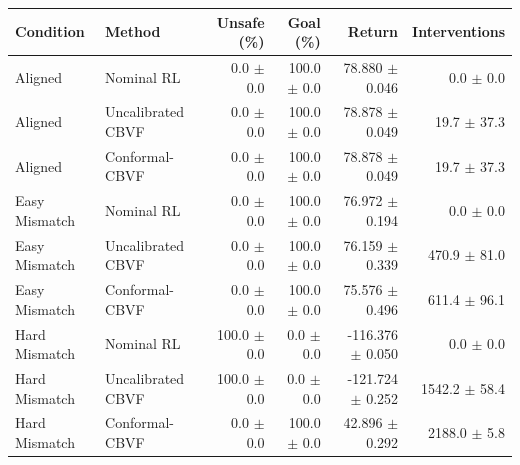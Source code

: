 \begin{tabular}{llrrrr}
\toprule
Condition & Method & Unsafe (\%) & Goal (\%) & Return & Interventions \\
\midrule
Aligned & Nominal RL & 0.0 $\pm$ 0.0 & 100.0 $\pm$ 0.0 & 78.880 $\pm$ 0.046 & 0.0 $\pm$ 0.0 \\
Aligned & Uncalibrated CBVF & 0.0 $\pm$ 0.0 & 100.0 $\pm$ 0.0 & 78.878 $\pm$ 0.049 & 19.7 $\pm$ 37.3 \\
Aligned & Conformal-CBVF & 0.0 $\pm$ 0.0 & 100.0 $\pm$ 0.0 & 78.878 $\pm$ 0.049 & 19.7 $\pm$ 37.3 \\
Easy Mismatch & Nominal RL & 0.0 $\pm$ 0.0 & 100.0 $\pm$ 0.0 & 76.972 $\pm$ 0.194 & 0.0 $\pm$ 0.0 \\
Easy Mismatch & Uncalibrated CBVF & 0.0 $\pm$ 0.0 & 100.0 $\pm$ 0.0 & 76.159 $\pm$ 0.339 & 470.9 $\pm$ 81.0 \\
Easy Mismatch & Conformal-CBVF & 0.0 $\pm$ 0.0 & 100.0 $\pm$ 0.0 & 75.576 $\pm$ 0.496 & 611.4 $\pm$ 96.1 \\
Hard Mismatch & Nominal RL & 100.0 $\pm$ 0.0 & 0.0 $\pm$ 0.0 & -116.376 $\pm$ 0.050 & 0.0 $\pm$ 0.0 \\
Hard Mismatch & Uncalibrated CBVF & 100.0 $\pm$ 0.0 & 0.0 $\pm$ 0.0 & -121.724 $\pm$ 0.252 & 1542.2 $\pm$ 58.4 \\
Hard Mismatch & Conformal-CBVF & 0.0 $\pm$ 0.0 & 100.0 $\pm$ 0.0 & 42.896 $\pm$ 0.292 & 2188.0 $\pm$ 5.8 \\
\bottomrule
\end{tabular}
